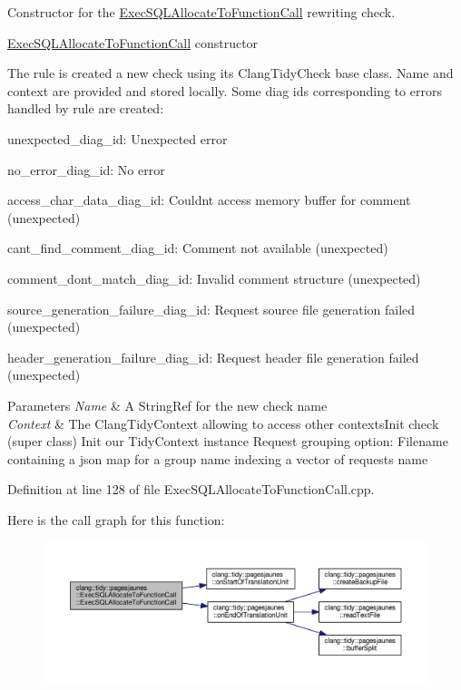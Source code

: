 Constructor for the \hyperlink{classclang_1_1tidy_1_1pagesjaunes_1_1_exec_s_q_l_allocate_to_function_call}{Exec\+S\+Q\+L\+Allocate\+To\+Function\+Call} rewriting check. 

\hyperlink{classclang_1_1tidy_1_1pagesjaunes_1_1_exec_s_q_l_allocate_to_function_call}{Exec\+S\+Q\+L\+Allocate\+To\+Function\+Call} constructor

The rule is created a new check using its {\ttfamily Clang\+Tidy\+Check} base class. Name and context are provided and stored locally. Some diag ids corresponding to errors handled by rule are created\+:
\begin{DoxyItemize}
\item unexpected\+\_\+diag\+\_\+id\+: Unexpected error
\item no\+\_\+error\+\_\+diag\+\_\+id\+: No error
\item access\+\_\+char\+\_\+data\+\_\+diag\+\_\+id\+: Couldn\textquotesingle{}t access memory buffer for comment (unexpected)
\item cant\+\_\+find\+\_\+comment\+\_\+diag\+\_\+id\+: Comment not available (unexpected)
\item comment\+\_\+dont\+\_\+match\+\_\+diag\+\_\+id\+: Invalid comment structure (unexpected)
\item source\+\_\+generation\+\_\+failure\+\_\+diag\+\_\+id\+: Request source file generation failed (unexpected)
\item header\+\_\+generation\+\_\+failure\+\_\+diag\+\_\+id\+: Request header file generation failed (unexpected)
\end{DoxyItemize}


\begin{DoxyParams}{Parameters}
{\em Name} & A String\+Ref for the new check name \\
\hline
{\em Context} & The Clang\+Tidy\+Context allowing to access other contexts\+Init check (super class) Init our Tidy\+Context instance Request grouping option\+: Filename containing a json map for a group name indexing a vector of requests name \\
\hline
\end{DoxyParams}


Definition at line 128 of file Exec\+S\+Q\+L\+Allocate\+To\+Function\+Call.\+cpp.

Here is the call graph for this function\+:
\nopagebreak
\begin{figure}[H]
\begin{center}
\leavevmode
\includegraphics[width=350pt]{classclang_1_1tidy_1_1pagesjaunes_1_1_exec_s_q_l_allocate_to_function_call_aa46155f099743916f57a31170e7f7d5b_cgraph}
\end{center}
\end{figure}


